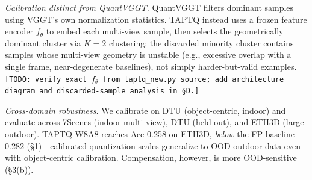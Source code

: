 \documentclass[9pt]{article}
\begin{document}
\noindent\emph{Calibration distinct from QuantVGGT.} QuantVGGT filters dominant samples using VGGT's own normalization statistics. TAPTQ instead uses a frozen feature encoder $f_\theta$ to embed each multi-view sample, then selects the geometrically dominant cluster via $K{=}2$ clustering; the discarded minority cluster contains samples whose multi-view geometry is unstable (e.g., excessive overlap with a single frame, near-degenerate baselines), not simply harder-but-valid examples. \texttt{[TODO: verify exact $f_\theta$ from taptq\_new.py source; add architecture diagram and discarded-sample analysis in \S D.]}

\noindent\emph{Cross-domain robustness.} We calibrate on DTU (object-centric, indoor) and evaluate across 7Scenes (indoor multi-view), DTU (held-out), and ETH3D (large outdoor). TAPTQ-W8A8 reaches Acc 0.258 on ETH3D, \emph{below} the FP baseline 0.282 (\S 1)---calibrated quantization scales generalize to OOD outdoor data even with object-centric calibration. Compensation, however, is more OOD-sensitive (\S 3(b)).
\end{document}
